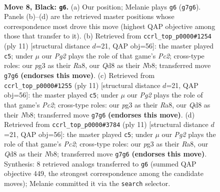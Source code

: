 \documentclass[11pt]{article}
\begin{document}
\begin{figure}[p]\centering
\begin{subfigure}{0.46\textwidth}\centering
\resizebox{\linewidth}{!}{%
\newchessgame
\chessboard[
  setfen={rnbq1rk1/1p2bppp/4pn2/p1pp4/P1P5/1P3NP1/3PPPBP/RNBQ1RK1 b - - 0 8},
  showmover=false,
  pgfstyle=straightmove, color=movearrow, markmove={g7-g6}
]}
\caption{}
\end{subfigure}\hfill
\begin{subfigure}{0.46\textwidth}\centering
\resizebox{\linewidth}{!}{%
\newchessgame
\chessboard[
  setfen={rnbq1rk1/ppp1bppp/4pn2/3p4/2P5/1P3NP1/P2PPPBP/RNBQ1RK1 b - - 4 6},
  showmover=false,
  pgfstyle=straightmove, color=movearrow, markmove={c7-c5}
]}
\caption{}
\end{subfigure}
\\[4pt]
\begin{subfigure}{0.46\textwidth}\centering
\resizebox{\linewidth}{!}{%
\newchessgame
\chessboard[
  setfen={rnbq1rk1/ppp1bppp/4pn2/3p4/2P5/1P3NP1/P2PPPBP/RNBQ1RK1 b - - 4 6},
  showmover=false,
  pgfstyle=straightmove, color=movearrow, markmove={c7-c5}
]}
\caption{}
\end{subfigure}\hfill
\begin{subfigure}{0.46\textwidth}\centering
\resizebox{\linewidth}{!}{%
\newchessgame
\chessboard[
  setfen={rnbq1rk1/ppp1bppp/4pn2/3p4/2P5/1P3NP1/P2PPPBP/RNBQ1RK1 b - - 0 6},
  showmover=false,
  pgfstyle=straightmove, color=movearrow, markmove={c7-c5}
]}
\caption{}
\end{subfigure}
\caption{\textbf{Move 8, Black: \texttt{g6}.} (a) Our position; Melanie plays \texttt{g6} (\texttt{g7g6}). Panels (b)--(d) are the retrieved master positions whose correspondence most drove this move (highest QAP objective among those that transfer to it). (b) Retrieved from \texttt{ccrl\_top\_p0000\#1254} (ply 11) [structural distance $d$=21, QAP obj=56]: the master played \texttt{c5}; under $\mu$ our \emph{Pg2} plays the role of that game's \emph{Pc2}; cross-type roles: our \emph{p}g3 as their \emph{R}a8, our \emph{Q}d8 as their \emph{N}b8; transferred move \texttt{g7g6} \textbf{(endorses this move)}. (c) Retrieved from \texttt{ccrl\_top\_p0000\#1255} (ply 11) [structural distance $d$=21, QAP obj=56]: the master played \texttt{c5}; under $\mu$ our \emph{Pg2} plays the role of that game's \emph{Pc2}; cross-type roles: our \emph{p}g3 as their \emph{R}a8, our \emph{Q}d8 as their \emph{N}b8; transferred move \texttt{g7g6} \textbf{(endorses this move)}. (d) Retrieved from \texttt{ccrl\_top\_p0000\#3784} (ply 11) [structural distance $d$=21, QAP obj=56]: the master played \texttt{c5}; under $\mu$ our \emph{Pg2} plays the role of that game's \emph{Pc2}; cross-type roles: our \emph{p}g3 as their \emph{R}a8, our \emph{Q}d8 as their \emph{N}b8; transferred move \texttt{g7g6} \textbf{(endorses this move)}. Synthesis: 8 retrieved analogs transferred to \texttt{g6} (summed QAP objective 449, the strongest correspondence among the candidate moves); Melanie committed it via the \texttt{search} selector.}
\label{fig:thought-m15}
\end{figure}
\end{document}
